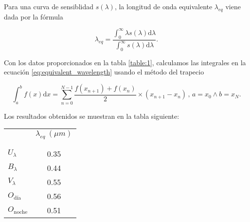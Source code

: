 \documentclass[12pt,a4paper]{practice}
\newcommand\integrate[4]{%
    \int_{#3}^{#4} {#1 \mathrm{d} #2}
}
\newcommand\trapezerule[4]{%
    \sum_{n=#3}^{#4} {\frac{#1(#2_{n+1}) + #1(#2_n)}{2} \times (#2_{n+1} - #2_n)}
}
\begin{document}
\begin{problem}
        \begin{solution}
            Para una curva de sensiblidad $s\left(\lambda \right)$, la longitud de onda equivalente $\lambda_{eq}$ viene dada por la fórmula

            \begin{equation}\label{eq:equivalent_wavelength}
                \lambda_{eq} = \frac{\displaystyle\integrate{\lambda s(\lambda)}{\lambda}{0}{\infty} }{\displaystyle\integrate{s(\lambda)}{\lambda}{0}{\infty}}.
            \end{equation}

            Con los datos proporcionados en  la tabla \ref{table:1}, calculamos las integrales en la ecuación \ref{eq:equivalent_wavelength} usando el método del trapecio

            \begin{equation*}
                \integrate{f(x)}{x}{a}{b} = \trapezerule{f}{x}{0}{N-1}\,,\,a=x_{0} \wedge b = x_N.
            \end{equation*}

            Los resultados obtenidos se muestran en la tabla siguiente:

            \begin{table}[h!]
                \centering
                \begin{tabular}{ l | c }
                      & $\lambda_{eq}\ (\mu m)$ \\
                      &  \\[-0.8em]\hline
                      &  \\[-0.8em]
                    $U_{\lambda}$  & 0.35 \\
                    $B_{\lambda}$  & 0.44 \\
                    $V_{\lambda}$  & 0.55 \\
                    $O_{\textrm{día}}$  & 0.56 \\
                    $O_{\textrm{noche}}$  & 0.51 \\
                    \hline
                \end{tabular}
            \end{table}
        \end{solution}
    \end{problem}
\end{document}
